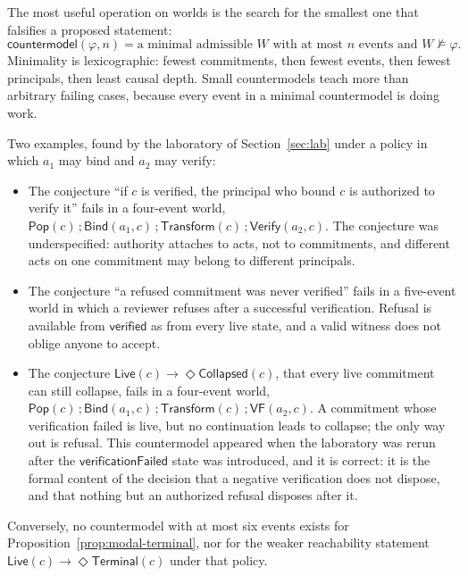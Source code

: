 \documentclass[11pt,openany]{book}
\theoremstyle{remark}
\newcommand{\Pop}{\mathsf{Pop}}
\newcommand{\Bind}{\mathsf{Bind}}
\newcommand{\Transform}{\mathsf{Transform}}
\newcommand{\Verify}{\mathsf{Verify}}
\begin{document}
The most useful operation on worlds is the search for the smallest one
that falsifies a proposed statement:
\[
\mathsf{countermodel}(\varphi,n)=\text{a minimal admissible }W
\text{ with at most }n\text{ events and }W\not\models\varphi.
\]
Minimality is lexicographic: fewest commitments, then fewest events, then
fewest principals, then least causal depth. Small countermodels teach more
than arbitrary failing cases, because every event in a minimal
countermodel is doing work.

Two examples, found by the laboratory of Section~\ref{sec:lab} under a
policy in which $a_1$ may bind and $a_2$ may verify:
\begin{itemize}[leftmargin=1.5em]
\item The conjecture ``if $c$ is verified, the principal who bound $c$ is
authorized to verify it'' fails in a four-event world,
$\Pop(c)\,;\Bind(a_1,c)\,;\Transform(c)\,;\Verify(a_2,c)$. The conjecture
was underspecified: authority attaches to acts, not to commitments, and
different acts on one commitment may belong to different principals.
\item The conjecture ``a refused commitment was never verified'' fails in
a five-event world in which a reviewer refuses after a successful
verification. Refusal is available from $\mathsf{verified}$ as from every
live state, and a valid witness does not oblige anyone to accept.
\item The conjecture $\mathsf{Live}(c)\rightarrow\Diamond\mathsf{Collapsed}(c)$,
that every live commitment can still collapse, fails in a four-event
world, $\Pop(c)\,;\Bind(a_1,c)\,;\Transform(c)\,;\mathsf{VF}(a_2,c)$. A
commitment whose verification failed is live, but no continuation leads to
collapse; the only way out is refusal. This countermodel appeared when the
laboratory was rerun after the $\mathsf{verificationFailed}$ state was
introduced, and it is correct: it is the formal content of the decision
that a negative verification does not dispose, and that nothing but an
authorized refusal disposes after it.
\end{itemize}
Conversely, no countermodel with at most six events exists for
Proposition~\ref{prop:modal-terminal}, nor for the weaker reachability
statement $\mathsf{Live}(c)\rightarrow\Diamond\mathsf{Terminal}(c)$ under
that policy.
\end{document}
